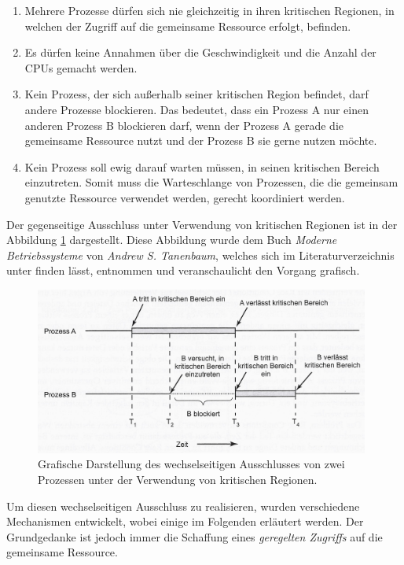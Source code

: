 				\begin{enumerate}
					\item Mehrere Prozesse dürfen sich nie gleichzeitig in ihren kritischen Regionen, in welchen der Zugriff auf die gemeinsame Ressource erfolgt, befinden.
					\item Es dürfen keine Annahmen über die Geschwindigkeit und die Anzahl der CPUs gemacht werden.
					\item Kein Prozess, der sich außerhalb seiner kritischen Region befindet, darf andere Prozesse blockieren. Das bedeutet, dass ein Prozess A nur einen anderen Prozess B blockieren darf, wenn der Prozess A gerade die gemeinsame Ressource nutzt und der Prozess B sie gerne nutzen möchte.
					\item Kein Prozess soll ewig darauf warten müssen, in seinen kritischen Bereich einzutreten. Somit muss die Warteschlange von Prozessen, die die gemeinsam genutzte Ressource verwendet werden, gerecht koordiniert werden.
				\end{enumerate}
				
				Der gegenseitige Ausschluss unter Verwendung von kritischen Regionen ist in der Abbildung \ref{fig:MutexKritischeRegionen} dargestellt. Diese Abbildung wurde dem Buch \textit{Moderne Betriebssysteme} von \textit{Andrew S. Tanenbaum}, welches sich im Literaturverzeichnis unter \cite{ModerneBetriebssysteme} finden lässt, entnommen und veranschaulicht den Vorgang grafisch.
				
				\begin{figure}
					\centering	
					\includegraphics[width=11cm]{Abbildungen/Mutex_kritische_Regionen.jpg}
					\caption{Grafische Darstellung des wechselseitigen Ausschlusses von zwei Prozessen unter der Verwendung von kritischen Regionen.}
					\label{fig:MutexKritischeRegionen}
				\end{figure}
				
				Um diesen wechselseitigen Ausschluss zu realisieren, wurden verschiedene Mechanismen entwickelt, wobei einige im Folgenden erläutert werden. Der Grundgedanke ist jedoch immer die Schaffung eines \textit{geregelten Zugriffs} auf die gemeinsame Ressource.\\
				

